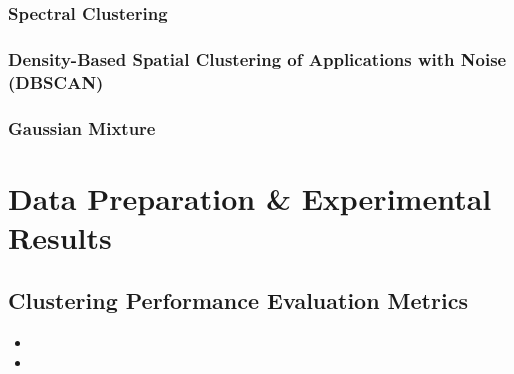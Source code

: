 \documentclass[conference]{IEEEtran}
\begin{document}
\subsubsection{Spectral Clustering}






\subsubsection{Density-Based Spatial Clustering of Applications with Noise (DBSCAN)}






\subsubsection{Gaussian Mixture}





\section{Data Preparation \& Experimental Results} \label{sec:eval}









\subsection{Clustering Performance Evaluation Metrics}
\begin{itemize}
    \item 

    \item 
\end{itemize}
\end{document}
